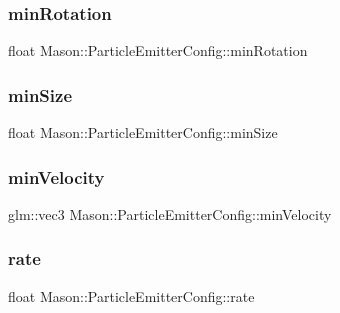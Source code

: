 \subsubsection{\texorpdfstring{min\+Rotation}{minRotation}}
{\footnotesize\ttfamily float Mason\+::\+Particle\+Emitter\+Config\+::min\+Rotation}

\hypertarget{struct_mason_1_1_particle_emitter_config_ab46ccc780e60c6b7006749058654455f}{}\label{struct_mason_1_1_particle_emitter_config_ab46ccc780e60c6b7006749058654455f} 
\subsubsection{\texorpdfstring{min\+Size}{minSize}}
{\footnotesize\ttfamily float Mason\+::\+Particle\+Emitter\+Config\+::min\+Size}

\hypertarget{struct_mason_1_1_particle_emitter_config_a3d8df085c0a91b61f42adc5eef888c79}{}\label{struct_mason_1_1_particle_emitter_config_a3d8df085c0a91b61f42adc5eef888c79} 
\subsubsection{\texorpdfstring{min\+Velocity}{minVelocity}}
{\footnotesize\ttfamily glm\+::vec3 Mason\+::\+Particle\+Emitter\+Config\+::min\+Velocity}

\hypertarget{struct_mason_1_1_particle_emitter_config_abc0c7231f9134e3b0456d22ee8d5c8a2}{}\label{struct_mason_1_1_particle_emitter_config_abc0c7231f9134e3b0456d22ee8d5c8a2} 
\subsubsection{\texorpdfstring{rate}{rate}}
{\footnotesize\ttfamily float Mason\+::\+Particle\+Emitter\+Config\+::rate}

\hypertarget{struct_mason_1_1_particle_emitter_config_a35b60fea30c8a07adcfc77a3c30e1546}{}\label{struct_mason_1_1_particle_emitter_config_a35b60fea30c8a07adcfc77a3c30e1546} 

